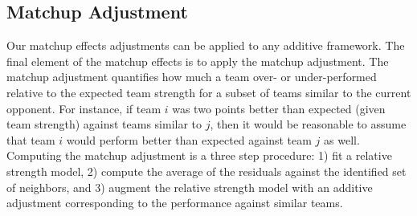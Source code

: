 \documentclass[letterpaper,12pt]{article}
\begin{document}
\subsection{Matchup Adjustment}
Our matchup effects adjustments can be applied to any additive framework. The final element of the matchup effects is to apply the matchup adjustment. The matchup adjustment quantifies how much a team over- or under-performed relative to the expected team strength for a subset of teams similar to the current opponent. For instance, if team $i$ was two points better than expected (given team strength) against teams similar to $j$, then it would be reasonable to assume that team $i$ would perform better than expected against team $j$ as well. Computing the matchup adjustment is a three step procedure: 1) fit a relative strength model, 2) compute the average of the residuals against the identified set of neighbors, and 3) augment the relative strength model with an additive adjustment corresponding to the performance against similar teams.
\end{document}
